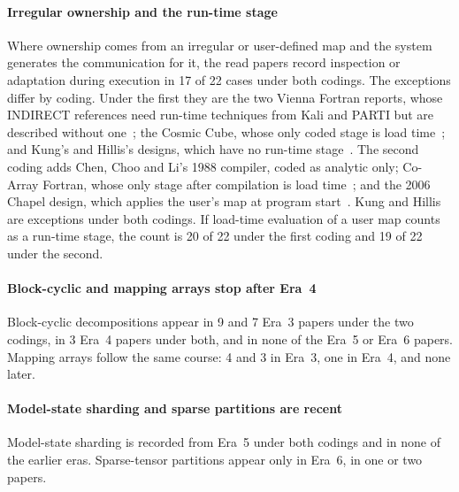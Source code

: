 \paragraph{Irregular ownership and the run-time stage}
Where ownership comes from an irregular or user-defined map and the system generates the communication for it, the read papers record inspection or adaptation during execution in 17 of 22 cases under both codings. The exceptions differ by coding. Under the first they are the two Vienna Fortran reports, whose INDIRECT references need run-time techniques from Kali and PARTI but are described without one~\cite{chapman1991vienna,chapman1992vienna}; the Cosmic Cube, whose only coded stage is load time~\cite{seitz1985cosmic}; and Kung's and Hillis's designs, which have no run-time stage~\cite{kung1982systolic,hillis1986data}. The second coding adds Chen, Choo and Li's 1988 compiler, coded as analytic only; Co-Array Fortran, whose only stage after compilation is load time~\cite{numrich1998coarray}; and the 2006 Chapel design, which applies the user's map at program start~\cite{diaconescu2006userdefined}. Kung and Hillis are exceptions under both codings. If load-time evaluation of a user map counts as a run-time stage, the count is 20 of 22 under the first coding and 19 of 22 under the second. 
\paragraph{Block-cyclic and mapping arrays stop after Era~4}
Block-cyclic decompositions appear in 9 and 7 Era~3 papers under the two codings, in 3 Era~4 papers under both, and in none of the Era~5 or Era~6 papers. Mapping arrays follow the same course: 4 and 3 in Era~3, one in Era~4, and none later. 

\paragraph{Model-state sharding and sparse partitions are recent}
Model-state sharding is recorded from Era~5 under both codings and in none of the earlier eras. Sparse-tensor partitions appear only in Era~6, in one or two papers.

